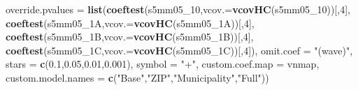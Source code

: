 \documentclass[
]{article}
\newenvironment{Shaded}{\begin{snugshade}}{\end{snugshade}}
\newcommand{\DataTypeTok}[1]{\textcolor[rgb]{0.13,0.29,0.53}{#1}}
\newcommand{\DecValTok}[1]{\textcolor[rgb]{0.00,0.00,0.81}{#1}}
\newcommand{\FloatTok}[1]{\textcolor[rgb]{0.00,0.00,0.81}{#1}}
\newcommand{\KeywordTok}[1]{\textcolor[rgb]{0.13,0.29,0.53}{\textbf{#1}}}
\newcommand{\NormalTok}[1]{#1}
\newcommand{\StringTok}[1]{\textcolor[rgb]{0.31,0.60,0.02}{#1}}
\begin{document}
\begin{Shaded}
\begin{Highlighting}[]
          \DataTypeTok{override.pvalues =} \KeywordTok{list}\NormalTok{(}\KeywordTok{coeftest}\NormalTok{(s5mm05_}\DecValTok{10}\NormalTok{,}\DataTypeTok{vcov.=}\KeywordTok{vcovHC}\NormalTok{(s5mm05_}\DecValTok{10}\NormalTok{))[,}\DecValTok{4}\NormalTok{],}
                                  \KeywordTok{coeftest}\NormalTok{(s5mm05_1A,}\DataTypeTok{vcov.=}\KeywordTok{vcovHC}\NormalTok{(s5mm05_1A))[,}\DecValTok{4}\NormalTok{],}
                                  \KeywordTok{coeftest}\NormalTok{(s5mm05_1B,}\DataTypeTok{vcov.=}\KeywordTok{vcovHC}\NormalTok{(s5mm05_1B))[,}\DecValTok{4}\NormalTok{],}
                                  \KeywordTok{coeftest}\NormalTok{(s5mm05_1C,}\DataTypeTok{vcov.=}\KeywordTok{vcovHC}\NormalTok{(s5mm05_1C))[,}\DecValTok{4}\NormalTok{]),}
          \DataTypeTok{omit.coef =} \StringTok{"(wave)"}\NormalTok{, }\DataTypeTok{stars =} \KeywordTok{c}\NormalTok{(}\FloatTok{0.1}\NormalTok{,}\FloatTok{0.05}\NormalTok{,}\FloatTok{0.01}\NormalTok{,}\FloatTok{0.001}\NormalTok{), }\DataTypeTok{symbol =} \StringTok{"+"}\NormalTok{,}
          \DataTypeTok{custom.coef.map =}\NormalTok{ vnmap, }
          \DataTypeTok{custom.model.names =} \KeywordTok{c}\NormalTok{(}\StringTok{"Base"}\NormalTok{,}\StringTok{"ZIP"}\NormalTok{,}\StringTok{"Municipality"}\NormalTok{,}\StringTok{"Full"}\NormalTok{))}
\end{Highlighting}
\end{Shaded}
\end{document}
